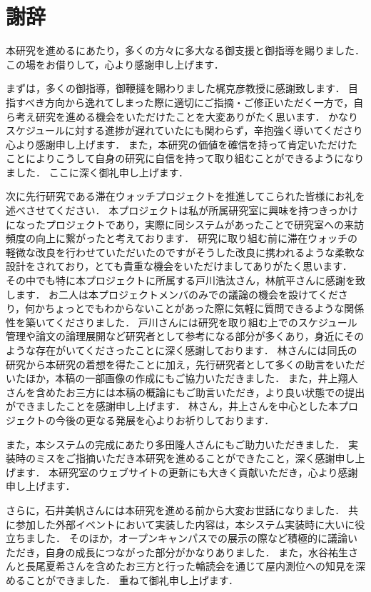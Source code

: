 \chapter*{謝辞}

本研究を進めるにあたり，多くの方々に多大なる御支援と御指導を賜りました．この場をお借りして，心より感謝申し上げます．


まずは，多くの御指導，御鞭撻を賜わりました梶克彦教授に感謝致します．
目指すべき方向から逸れてしまった際に適切にご指摘・ご修正いただく一方で，自ら考え研究を進める機会をいただけたことを大変ありがたく思います．
かなりスケジュールに対する進捗が遅れていたにも関わらず，辛抱強く導いてくださり心より感謝申し上げます．
また，本研究の価値を確信を持って肯定いただけたことによりこうして自身の研究に自信を持って取り組むことができるようになりました．
ここに深く御礼申し上げます．

次に先行研究である滞在ウォッチプロジェクトを推進してこられた皆様にお礼を述べさせてください．
本プロジェクトは私が所属研究室に興味を持つきっかけになったプロジェクトであり，実際に同システムがあったことで研究室への来訪頻度の向上に繋がったと考えております．
研究に取り組む前に滞在ウォッチの軽微な改良を行わせていただいたのですがそうした改良に携われるような柔軟な設計をされており，とても貴重な機会をいただけましてありがたく思います．
その中でも特に本プロジェクトに所属する戸川浩汰さん，林航平さんに感謝を致します．
お二人は本プロジェクトメンバのみでの議論の機会を設けてくださり，何かちょっとでもわからないことがあった際に気軽に質問できるような関係性を築いてくださりました．
戸川さんには研究を取り組む上でのスケジュール管理や論文の論理展開など研究者として参考になる部分が多くあり，身近にそのような存在がいてくださったことに深く感謝しております．
林さんには同氏の研究から本研究の着想を得たことに加え，先行研究者として多くの助言をいただいたほか，本稿の一部画像の作成にもご協力いただきました．
また，井上翔人さんを含めたお三方には本稿の概論にもご助言いただき，より良い状態での提出ができましたことを感謝申し上げます．
林さん，井上さんを中心とした本プロジェクトの今後の更なる発展を心よりお祈りしております．


また，本システムの完成にあたり多田隆人さんにもご助力いただきました．
実装時のミスをご指摘いただき本研究を進めることができたこと，深く感謝申し上げます．
本研究室のウェブサイトの更新にも大きく貢献いただき，心より感謝申し上げます．


さらに，石井美帆さんには本研究を進める前から大変お世話になりました．
共に参加した外部イベントにおいて実装した内容は，本システム実装時に大いに役立ちました．
そのほか，オープンキャンパスでの展示の際など積極的に議論いただき，自身の成長につながった部分がかなりありました．
また，水谷祐生さんと長尾夏希さんを含めたお三方と行った輪読会を通じて屋内測位への知見を深めることができました．
重ねて御礼申し上げます．


